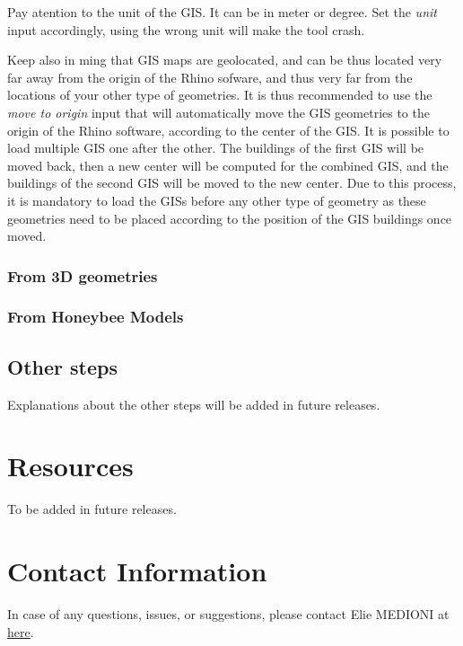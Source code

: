 \documentclass[a4paper,12pt]{article} %
\begin{document}
        Pay atention to the unit of the GIS.
        It can be in meter or degree.
        Set the \textit{unit} input accordingly, using the wrong unit will make the tool crash.

        Keep also in ming that GIS maps are geolocated, and can be thus located very far away from the origin of the Rhino sofware, and thus very far from the locations of your other type of geometries.
        It is thus recommended to use the \textit{move to origin} input that will automatically move the GIS geometries to the origin of the Rhino software, according to the center of the GIS.
        It is possible to load multiple GIS one after the other.
        The buildings of the first GIS will be moved back, then a new center will be computed for the combined GIS, and the buildings of the second GIS will be moved to the new center.
        Due to this process, it is mandatory to load the GISs before any other type of geometry as these geometries need to be placed according to the position of the GIS buildings once moved.

        \subsubsection{From 3D geometries}
        \label{subsubsec:from-3d-geometries}


        \subsubsection{From Honeybee Models}
        \label{subsubsec:from-honeybee-models}

    \subsection{Other steps}
    Explanations about the other steps will be added in future releases.

\section{Resources}
\label{sec:resources}
To be added in future releases.

\section{Contact Information}
\label{sec:Contact Information}
In case of any questions, issues, or suggestions, please contact Elie MEDIONI at \href{mailto:elie-medioni@campus.technion.ac.il}{here}.
\end{document}
